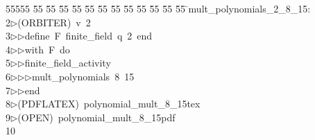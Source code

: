 %
%
\begin{tabbing}
55555 \= 55 \= 55 \= 55 \= 55 \= 55 \= 55 \= 55 \= 55 \= 55 \= 55 \= 55 \= 55 \= \>mult\_polynomials\_2\_8\_15:\\[0pt]
2\>$\triangleright$\>(ORBITER)\ v\ 2\ \\[0pt]
3\>$\triangleright$\>$\triangleright$\>define\ F\ finite\_field\ q\ 2\ end\ \\[0pt]
4\>$\triangleright$\>$\triangleright$\>with\ F\ do\ \\[0pt]
5\>$\triangleright$\>$\triangleright$\>finite\_field\_activity\ \\[0pt]
6\>$\triangleright$\>$\triangleright$\>$\triangleright$\>mult\_polynomials\ 8\ 15\ \\[0pt]
7\>$\triangleright$\>$\triangleright$\>end\\[0pt]
8\>$\triangleright$\>(PDFLATEX)\ polynomial\_mult\_8\_15tex\\[0pt]
9\>$\triangleright$\>(OPEN)\ polynomial\_mult\_8\_15pdf\\[0pt]
10\>\end{tabbing}
